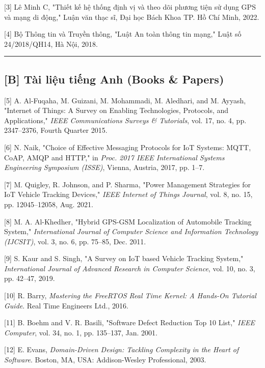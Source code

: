 \documentclass[a4paper]{extarticle}
\begin{document}
{[}3{]} Lê Minh C, "Thiết kế hệ thống định vị và theo dõi phương tiện sử
dụng GPS và mạng di động," Luận văn thạc sĩ, Đại học Bách Khoa TP. Hồ
Chí Minh, 2022.

{[}4{]} Bộ Thông tin và Truyền thông, "Luật An toàn thông tin mạng,"
Luật số 24/2018/QH14, Hà Nội, 2018.

\begin{center}\rule{0.5\linewidth}{0.5pt}\end{center}

\subsection{{[}B{]} Tài liệu tiếng Anh (Books \&
Papers)}\label{b-tuxe0i-liux1ec7u-tiux1ebfng-anh-books--papers}

{[}5{]} A. Al-Fuqaha, M. Guizani, M. Mohammadi, M. Aledhari, and M.
Ayyash, "Internet of Things: A Survey on Enabling Technologies,
Protocols, and Applications," \emph{IEEE Communications Surveys \&
Tutorials}, vol. 17, no. 4, pp. 2347--2376, Fourth Quarter 2015.

{[}6{]} N. Naik, "Choice of Effective Messaging Protocols for IoT
Systems: MQTT, CoAP, AMQP and HTTP," in \emph{Proc. 2017 IEEE
International Systems Engineering Symposium (ISSE)}, Vienna, Austria,
2017, pp. 1--7.

{[}7{]} M. Quigley, R. Johnson, and P. Sharma, "Power Management
Strategies for IoT Vehicle Tracking Devices," \emph{IEEE Internet of
Things Journal}, vol. 8, no. 15, pp. 12045--12058, Aug. 2021.

{[}8{]} M. A. Al-Khedher, "Hybrid GPS-GSM Localization of Automobile
Tracking System," \emph{International Journal of Computer Science and
Information Technology (IJCSIT)}, vol. 3, no. 6, pp. 75--85, Dec. 2011.

{[}9{]} S. Kaur and S. Singh, "A Survey on IoT based Vehicle Tracking
System," \emph{International Journal of Advanced Research in Computer
Science}, vol. 10, no. 3, pp. 42--47, 2019.

{[}10{]} R. Barry, \emph{Mastering the FreeRTOS Real Time Kernel: A
Hands-On Tutorial Guide}. Real Time Engineers Ltd., 2016.

{[}11{]} B. Boehm and V. R. Basili, "Software Defect Reduction Top 10
List," \emph{IEEE Computer}, vol. 34, no. 1, pp. 135--137, Jan. 2001.

{[}12{]} E. Evans, \emph{Domain-Driven Design: Tackling Complexity in
the Heart of Software}. Boston, MA, USA: Addison-Wesley Professional,
2003.
\end{document}

